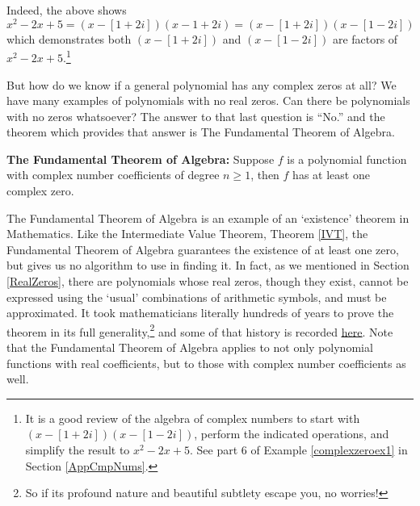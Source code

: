 Indeed, the above shows $x^2-2x+5  = (x-[1+2i])(x-1+2i)= (x-[1+2i])(x-[1-2i])$ which demonstrates both  $(x-[1+2i])$ and  $(x-[1-2i])$ are factors of $x^2-2x+5$.\footnote{It is a good review of the algebra of complex numbers to start with  $(x-[1+2i])(x-[1-2i])$, perform the indicated operations, and simplify the result to $x^2-2x+5$.  See part 6 of  Example \ref{complexzeroex1}  in Section  \ref{AppCmpNums}.}

 But how do we know if a general polynomial has any complex zeros at all?  We have many examples of polynomials with no real zeros.  Can there be polynomials with no zeros whatsoever?  The answer to that last question is ``No.'' and the theorem which provides that answer is  The Fundamental Theorem of Algebra.

\begin{tcolorbox}
\begin{thm} \label{ftoa} \textbf{The Fundamental Theorem of Algebra:}  Suppose $f$ is a polynomial function with complex number coefficients of degree $n \geq 1$, then $f$ has at least one complex zero.

\end{thm}
\end{tcolorbox}

The Fundamental Theorem of Algebra is an example of an `existence' theorem in Mathematics.  Like the Intermediate Value Theorem, Theorem \ref{IVT}, the Fundamental Theorem of Algebra  guarantees the existence of at least one zero, but gives us no algorithm to use in finding it.  In fact, as we mentioned in Section \ref{RealZeros}, there are polynomials whose real zeros, though they exist, cannot be expressed using the `usual' combinations of arithmetic symbols, and must be approximated.  It took mathematicians literally hundreds of years to prove the theorem in its full generality,\footnote{So if its profound nature and beautiful subtlety escape you, no worries!} and some of that history is recorded \href{http://en.wikipedia.org/wiki/Fundamental_theorem_of_algebra}{\underline{here}}.  Note that the Fundamental Theorem of Algebra  applies to not only polynomial functions with real coefficients, but to those with complex number coefficients as well.  

